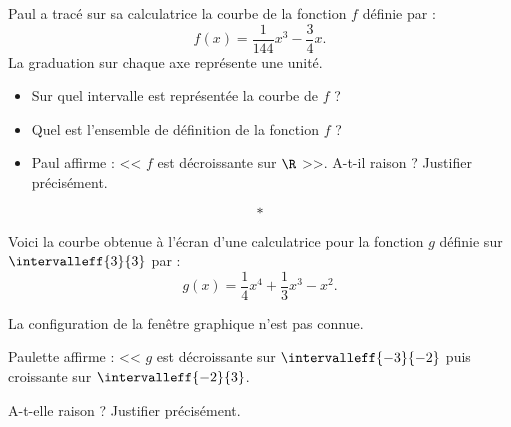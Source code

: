 \documentclass[12pt,french]{book}
\begin{document}

\exo

Paul a tracé sur sa calculatrice la courbe de la fonction $f$ définie par :
\[f(x) = \frac{1}{144}x^3 - \frac 3 4 x.\]
La graduation sur chaque axe représente une unité.

\begin{center}
\end{center}

\begin{itemize}
    \item Sur quel intervalle est représentée la courbe de $f$ ?
    \item Quel est l'ensemble de définition de la fonction $f$ ?
    \item Paul affirme : << $f$ est décroissante sur $\R$ >>. A-t-il raison ? Justifier précisément.
\end{itemize}\[*\]

\exo

Voici la courbe obtenue à l'écran d'une calculatrice pour la fonction $g$ définie sur $\intervalleff{3}{3}$ par :
\[g(x) = \frac 1 4 x^4 + \frac13 x^3 - x^2.\]

\begin{center}
\end{center}

La configuration de la fenêtre graphique n'est pas connue.

Paulette affirme : << $g$ est décroissante sur $\intervalleff{-3}{-2}$ puis croissante sur $\intervalleff{-2}{3}$.\par
A-t-elle raison ? Justifier précisément.
\end{document}
